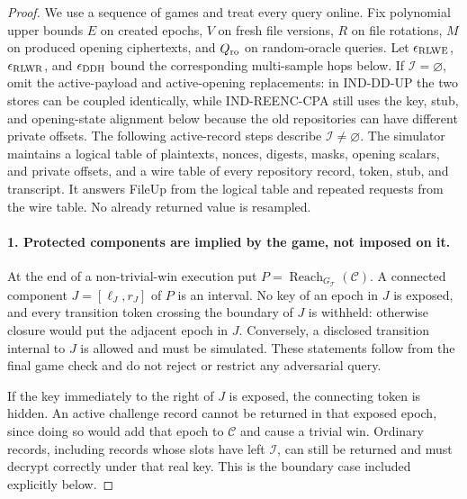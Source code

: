 \begin{proof}
We use a sequence of games and treat every query online. Fix polynomial upper bounds $E$ on created epochs, $V$ on fresh file versions, $R$ on file rotations, $M$ on produced opening ciphertexts, and $Q_{\rm ro}$ on random-oracle queries. Let $\epsilon_{\rm RLWE}$, $\epsilon_{\rm RLWR}$, and $\epsilon_{\rm DDH}$ bound the corresponding multi-sample hops below. If $\mathcal I=\varnothing$, omit the active-payload and active-opening replacements: in IND-DD-UP the two stores can be coupled identically, while IND-REENC-CPA still uses the key, stub, and opening-state alignment below because the old repositories can have different private offsets. The following active-record steps describe $\mathcal I\ne\varnothing$. The simulator maintains a logical table of plaintexts, nonces, digests, masks, opening scalars, and private offsets, and a wire table of every repository record, token, stub, and transcript. It answers FileUp from the logical table and repeated requests from the wire table. No already returned value is resampled.

\paragraph{1. Protected components are implied by the game, not imposed on it.}
At the end of a non-trivial-win execution put $P=\operatorname{Reach}_{G_{\mathcal T}}(\mathcal C)$. A connected component $J=[\ell_J,r_J]$ of $P$ is an interval. No key of an epoch in $J$ is exposed, and every transition token crossing the boundary of $J$ is withheld: otherwise closure would put the adjacent epoch in $J$. Conversely, a disclosed transition internal to $J$ is allowed and must be simulated. These statements follow from the final game check and do not reject or restrict any adversarial query.

If the key immediately to the right of $J$ is exposed, the connecting token is hidden. An active challenge record cannot be returned in that exposed epoch, since doing so would add that epoch to $\mathcal C$ and cause a trivial win. Ordinary records, including records whose slots have left $\mathcal I$, can still be returned and must decrypt correctly under that real key. This is the boundary case included explicitly below.


\end{proof}
